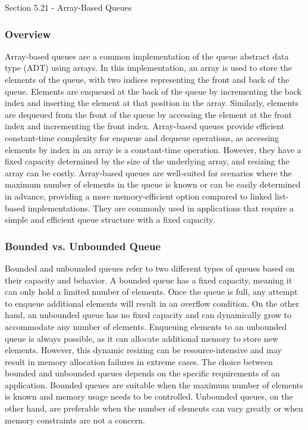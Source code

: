 \begin{notes}{Section 5.21 - Array-Based Queues}
    \subsubsection*{Overview}

    Array-based queues are a common implementation of the queue abstract data type (ADT) using arrays. In this implementation, an array is used to store the elements of the queue, with two indices representing the front and back of the queue. Elements are enqueued at the back of the queue by incrementing the back index and inserting the element at that position in the array. Similarly, elements are 
    dequeued from the front of the queue by accessing the element at the front index and incrementing the front index. Array-based queues provide efficient constant-time complexity for enqueue and dequeue operations, as accessing elements by index in an array is a constant-time operation. However, they have a fixed capacity determined by the size of the underlying array, and resizing the array can 
    be costly. Array-based queues are well-suited for scenarios where the maximum number of elements in the queue is known or can be easily determined in advance, providing a more memory-efficient option compared to linked list-based implementations. They are commonly used in applications that require a simple and efficient queue structure with a fixed capacity.

    \subsubsection*{Bounded vs. Unbounded Queue}

    Bounded and unbounded queues refer to two different types of queues based on their capacity and behavior. A bounded queue has a fixed capacity, meaning it can only hold a limited number of elements. Once the queue is full, any attempt to enqueue additional elements will result in an overflow condition. On the other hand, an unbounded queue has no fixed capacity and can dynamically grow to accommodate 
    any number of elements. Enqueuing elements to an unbounded queue is always possible, as it can allocate additional memory to store new elements. However, this dynamic resizing can be resource-intensive and may result in memory allocation failures in extreme cases. The choice between bounded and unbounded queues depends on the specific requirements of an application. Bounded queues are suitable when 
    the maximum number of elements is known and memory usage needs to be controlled. Unbounded queues, on the other hand, are preferable when the number of elements can vary greatly or when memory constraints are not a concern.
    

\end{notes}
